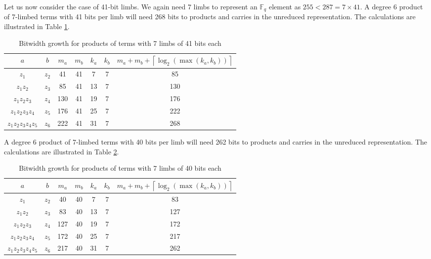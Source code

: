 \documentclass[a4paper, 12pt]{article}
\begin{document}
Let us now consider the case of 41-bit limbs. We again need 7 limbs to represent an $\mathbb{F}_q$ element as $255 < 287 = 7\times 41$. A degree 6 product of 7-limbed terms with 41 bits per limb will need 268 bits to products and carries in the unreduced representation. The calculations are illustrated in Table \ref{tab:limb41}.
\begin{table}[h]
  \centering
  \begin{tabular}{c|c|c|c|c|c|c}
    $a$ & $b$ & $m_a$ & $m_b$ & $k_a$ & $k_b$ & $m_a+m_b+\left\lceil \log_2 \left( \max\left( k_a, k_b \right) \right) \right\rceil$ \\ \hline
    $z_1$ & $z_2$ & 41 & 41 & 7 & 7 & 85 \\ \hline
    $z_1z_2$ & $z_3$ & 85 & 41 & 13 & 7 & 130 \\ \hline
    $z_1z_2z_3$ & $z_4$ & 130 & 41 & 19 & 7 & 176 \\ \hline
    $z_1z_2z_3z_4$ & $z_5$ & 176 & 41 & 25 & 7 & 222 \\ \hline
    $z_1z_2z_3z_4z_5$ & $z_6$ & 222 & 41 & 31 & 7 & 268 \\ \hline
  \end{tabular}
  \caption{Bitwidth growth for products of terms with 7 limbs of 41 bits each}
  \label{tab:limb41}
\end{table}

A degree 6 product of 7-limbed terms with 40 bits per limb will need 262 bits to products and carries in the unreduced representation. The calculations are illustrated in Table \ref{tab:limb40}.
\begin{table}[h]
  \centering
  \begin{tabular}{c|c|c|c|c|c|c}
    $a$ & $b$ & $m_a$ & $m_b$ & $k_a$ & $k_b$ & $m_a+m_b+\left\lceil \log_2 \left( \max\left( k_a, k_b \right) \right) \right\rceil$ \\ \hline
    $z_1$ & $z_2$ & 40 & 40 & 7 & 7 & 83 \\ \hline
    $z_1z_2$ & $z_3$ & 83 & 40 & 13 & 7 & 127 \\ \hline
    $z_1z_2z_3$ & $z_4$ & 127 & 40 & 19 & 7 & 172 \\ \hline
    $z_1z_2z_3z_4$ & $z_5$ & 172 & 40 & 25 & 7 & 217 \\ \hline
    $z_1z_2z_3z_4z_5$ & $z_6$ & 217 & 40 & 31 & 7 & 262 \\ \hline
  \end{tabular}
  \caption{Bitwidth growth for products of terms with 7 limbs of 40 bits each}
  \label{tab:limb40}
\end{table}
\end{document}

